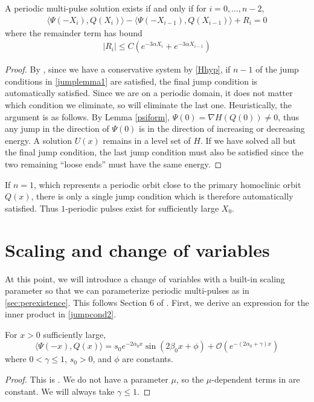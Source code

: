 \documentclass[thesis.tex]{subfiles}
\begin{document}
\begin{lemma}\label{jumplemma2}
A periodic multi-pulse solution exists if and only if for $i = 0, \dots, n-2$,
\begin{align}\label{jumpcond2}
\langle \Psi(-X_i), Q(X_i) \rangle - \langle \Psi(-X_{i-1}), Q(X_{i-1}) \rangle + R_i = 0
\end{align}
where the remainder term has bound
\begin{align*}
|R_i| \leq C ( e^{-3 \alpha X_i} +  e^{-3 \alpha X_{i-1}})
\end{align*}
\begin{proof}
By \cite[p. 2093]{SandstedeStrut}, since we have a conservative system by \cref{Hhyp}, if $n-1$ of the jump conditions in \cref{jumplemma1} are satisfied, the final jump condition is automatically satisfied. Since we are on a periodic domain, it does not matter which condition we eliminate, so will eliminate the last one. Heuristically, the argument is as follows. By Lemma \ref{psiform}, $\Psi(0) = \nabla H(Q(0)) \neq 0$, thus any jump in the direction of $\Psi(0)$ is in the direction of increasing or decreasing energy. A solution $U(x)$ remains in a level set of $H$. If we have solved all but the final jump condition, the last jump condition must also be satisfied since the two remaining ``loose ends'' must have the same energy.
\end{proof}
\end{lemma}

\begin{remark}
If $n = 1$, which represents a periodic orbit close to the primary homoclinic orbit $Q(x)$, there is only a single jump condition which is therefore automatically satisfied. Thus $1$-periodic pulses exist for sufficiently large $X_0$.
\end{remark}

\section{Scaling and change of variables}\label{sec:rescale}

At this point, we will introduce a change of variables with a built-in scaling parameter so that we can parameterize periodic multi-pulses as in \cref{sec:perexistence}. This follows Section 6 of \cite{Sandstede1998}. First, we derive an expression for the inner product in \ref{jumpcond2}.


\begin{lemma}\label{IPform}
For $x > 0$ sufficiently large,
\begin{equation}\label{IPalphabeta}
\langle \Psi(-x), Q(x) \rangle
= s_0 e^{-2 \alpha_0 x} \sin(2 \beta_0 x + \phi) + \mathcal{O}(e^{-(2 \alpha_0 + \gamma) x})
\end{equation}
where $0 < \gamma \leq 1$, $s_0 > 0$, and $\phi$ are constants.
\begin{proof}
This is \cite[Lemma 6.1(i)]{Sandstede1998}. We do not have a parameter $\mu$, so the $\mu$-dependent terms in \cite[Lemma 6.1(i)]{Sandstede1998} are constant. We will always take $\gamma \leq 1$.
\end{proof}
\end{lemma}
\end{document}
